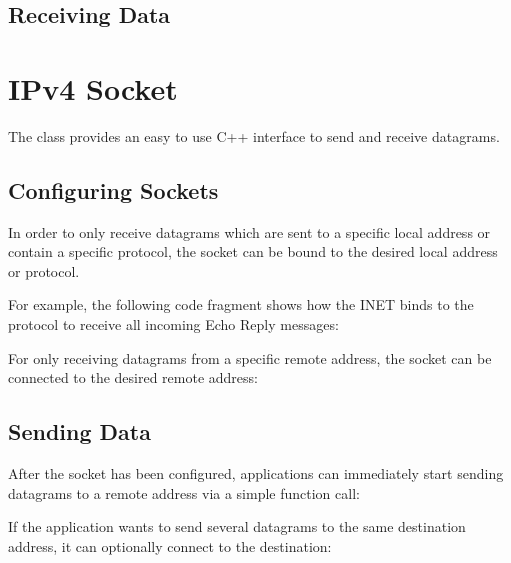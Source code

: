 
\subsection*{Receiving Data}


\section{IPv4 Socket}

The  class provides an easy to use C++ interface to send
and receive  datagrams.

\subsection*{Configuring Sockets}

In order to only receive  datagrams which are sent to a specific
local address or contain a specific protocol, the socket can be bound to the
desired local address or protocol.

For example, the following code fragment shows how the INET 
binds to the  protocol to receive all incoming
 Echo Reply messages:


For only receiving  datagrams from a specific remote address, the
socket can be connected to the desired remote address:


\subsection*{Sending Data}

After the socket has been configured, applications can immediately start sending
 datagrams to a remote address via a simple function call:


If the application wants to send several  datagrams to the same
destination address, it can optionally connect to the destination:

